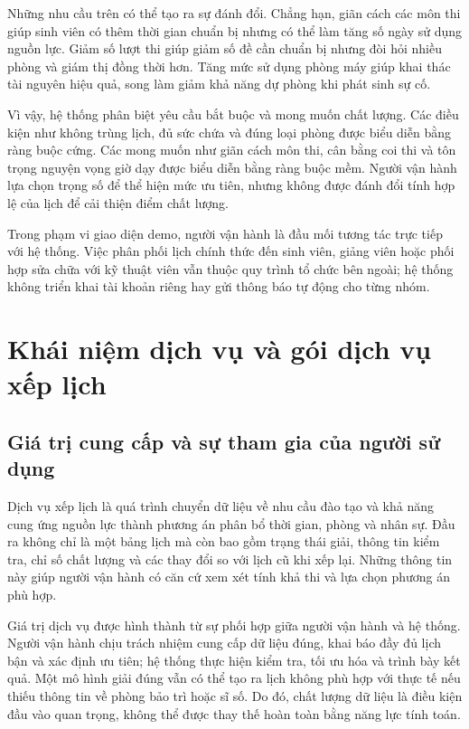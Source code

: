 Những nhu cầu trên có thể tạo ra sự đánh đổi. Chẳng hạn, giãn cách các môn thi giúp sinh viên có thêm thời gian chuẩn bị nhưng có thể làm tăng số ngày sử dụng nguồn lực. Giảm số lượt thi giúp giảm số đề cần chuẩn bị nhưng đòi hỏi nhiều phòng và giám thị đồng thời hơn. Tăng mức sử dụng phòng máy giúp khai thác tài nguyên hiệu quả, song làm giảm khả năng dự phòng khi phát sinh sự cố.

Vì vậy, hệ thống phân biệt yêu cầu bắt buộc và mong muốn chất lượng. Các điều kiện như không trùng lịch, đủ sức chứa và đúng loại phòng được biểu diễn bằng ràng buộc cứng. Các mong muốn như giãn cách môn thi, cân bằng coi thi và tôn trọng nguyện vọng giờ dạy được biểu diễn bằng ràng buộc mềm. Người vận hành lựa chọn trọng số để thể hiện mức ưu tiên, nhưng không được đánh đổi tính hợp lệ của lịch để cải thiện điểm chất lượng.

Trong phạm vi giao diện demo, người vận hành là đầu mối tương tác trực tiếp với hệ thống. Việc phân phối lịch chính thức đến sinh viên, giảng viên hoặc phối hợp sửa chữa với kỹ thuật viên vẫn thuộc quy trình tổ chức bên ngoài; hệ thống không triển khai tài khoản riêng hay gửi thông báo tự động cho từng nhóm.

\section{Khái niệm dịch vụ và gói dịch vụ xếp lịch}
\label{sec:goi-dich-vu}

\subsection{Giá trị cung cấp và sự tham gia của người sử dụng}

Dịch vụ xếp lịch là quá trình chuyển dữ liệu về nhu cầu đào tạo và khả năng cung ứng nguồn lực thành phương án phân bổ thời gian, phòng và nhân sự. Đầu ra không chỉ là một bảng lịch mà còn bao gồm trạng thái giải, thông tin kiểm tra, chỉ số chất lượng và các thay đổi so với lịch cũ khi xếp lại. Những thông tin này giúp người vận hành có căn cứ xem xét tính khả thi và lựa chọn phương án phù hợp.

Giá trị dịch vụ được hình thành từ sự phối hợp giữa người vận hành và hệ thống. Người vận hành chịu trách nhiệm cung cấp dữ liệu đúng, khai báo đầy đủ lịch bận và xác định ưu tiên; hệ thống thực hiện kiểm tra, tối ưu hóa và trình bày kết quả. Một mô hình giải đúng vẫn có thể tạo ra lịch không phù hợp với thực tế nếu thiếu thông tin về phòng bảo trì hoặc sĩ số. Do đó, chất lượng dữ liệu là điều kiện đầu vào quan trọng, không thể được thay thế hoàn toàn bằng năng lực tính toán.

